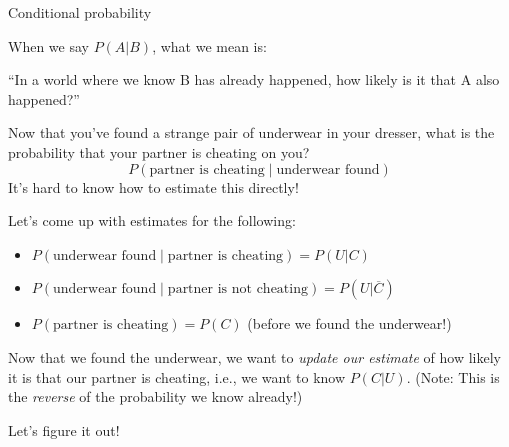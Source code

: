 \documentclass{beamer}\usepackage[]{graphicx}\usepackage[]{color}
\begin{document}
\begin{darkframes}
\begin{frame}{Conditional probability}
  \begin{center}
    When we say $P(A|B)$, what we mean is:
    \bigskip

    ``In a world where we know B has already happened, how likely is it that A also happened?''
  \end{center}
\end{frame}

\begin{frame}
\end{frame}

\begin{frame}
\end{frame}

\begin{frame}
  \begin{center}
    Now that you’ve found a strange pair of underwear in your dresser, what is the probability that your partner is cheating on you?
    \bigskip
    \[ P(\text{partner is cheating} \mid \text{underwear found}) \]
    \pause\bigskip
    It's hard to know how to estimate this directly!
  \end{center}
\end{frame}

\begin{frame}
  Let's come up with estimates for the following:
  \begin{itemize}[<+->]
    \item $P(\text{underwear found} \mid \text{partner is cheating}) = P(U|C)$
    \item $P(\text{underwear found} \mid \text{partner is not cheating}) = P(U|\overline C)$
    \item $P(\text{partner is cheating}) = P(C)$ (before we found the underwear!)
  \end{itemize}
  \pause
  Now that we found the underwear, we want to \emph{update our estimate} of how likely it is that our partner is cheating, i.e., we want to know $P(C|U)$.
  \newline\pause
  (Note: This is the \emph{reverse} of the probability we know already!)
\end{frame}

\begin{frame}{Let's figure it out!}


\end{frame}
\end{darkframes}
\end{document}
